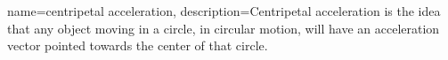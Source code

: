 {
    name=centripetal acceleration,
    description={Centripetal acceleration is the idea that any object moving in a circle, in circular motion, will have an acceleration vector pointed towards the center of that circle.}
}
